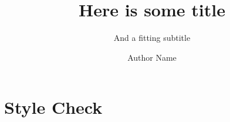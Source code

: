 \documentclass{../tudelft-report}
\begin{document}
\frontmatter
\title{Here is some title}
\subtitle{And a fitting subtitle}
\author{Author Name}
\subject{Subject} %
\makecover


\tableofcontents

\mainmatter
{}
\chapter{Style Check}
\label{ch:Style}
\newpage


\nochapterimage
\printbibliography
\end{document}
